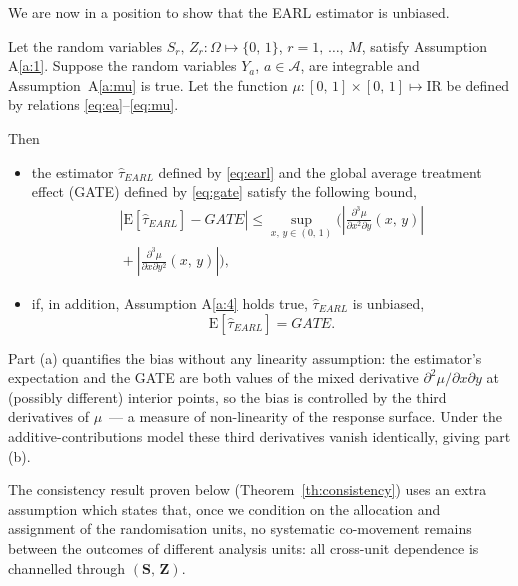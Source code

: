 \documentclass[sigconf]{acmart}
\newcounter{assumption}
\newcommand{\E}{\mathrm E}
\newcommand{\R}{\mathrm{I}\!\mathrm{R}}
\newcommand{\nn}{\nonumber}
\begin{document}
We are now in a position to show that the EARL estimator is unbiased.
\begin{theorem}\label{th:unbiasedness}
    Let the random variables $S_r,\,Z_r\colon\Omega\mapsto\{0,\,1\}$, $r=1,\,\ldots,\,M$, satisfy Assumption A\ref{a:1}. Suppose the random variables $Y_a$, $a\in\mathcal A$, are integrable and Assumption~A\ref{a:mu} is true. Let the function $\mu\colon[0,\,1]\times[0,\,1]\mapsto\R$ be defined by relations \eqref{eq:ea}--\eqref{eq:mu}.

    Then
    \begin{itemize}
    \item[\textup{(a)}] the estimator $\hat\tau_{EARL}$ defined by \eqref{eq:earl} and the global average treatment effect (GATE) defined by \eqref{eq:gate} satisfy the following bound,
    \begin{eqnarray}\label{eq:bound}
        \left|\E[\hat\tau^{\phantom{1}}_{EARL}] - GATE\right| \le \sup_{x,\,y\in(0,\,1)}\Bigg(\left|\frac{\partial^3\mu}{\partial x^2\partial y}(x,\,y)\right| \nn\\ {}+ \left|\frac{\partial^3\mu}{\partial  x\partial y^2}(x,\,y)\right|\Bigg),
    \end{eqnarray}
    \item[\textup{(b)}] if, in addition, Assumption A\ref{a:4} holds true, $\hat \tau_{EARL}$ is unbiased,
    \begin{equation}\label{eq:unbiasedness}
        \E[\hat\tau^{\phantom{1}}_{EARL}] = GATE.
    \end{equation}
    \end{itemize}
\end{theorem}

Part (a) quantifies the bias without any linearity assumption: the estimator's expectation and the GATE are both values of the mixed derivative $\partial^2\mu/\partial x\partial y$ at (possibly different) interior points, so the bias is controlled by the third derivatives of $\mu$~--- a measure of non-linearity of the response surface. Under the additive-contributions model these third derivatives vanish identically, giving part (b).

The consistency result proven below (Theorem~\ref{th:consistency}) uses an extra assumption which states that, once we condition on the allocation and assignment of the randomisation units, no systematic co-movement remains between the outcomes of different analysis units: all cross-unit dependence is channelled through $(\mathbf S,\,\mathbf Z)$.
\end{document}
